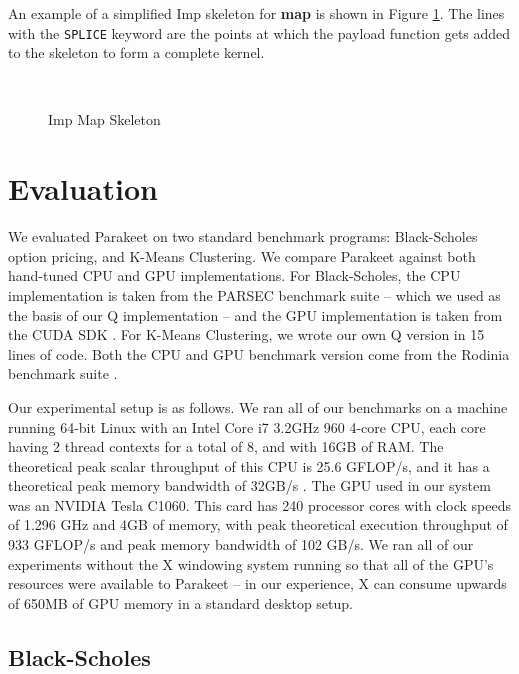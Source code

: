 \documentclass[preprint]{sigplanconf}
\begin{document}
An example of a simplified Imp skeleton for \textbf{map} is shown in Figure \ref{ImpMap}.  The lines with the \texttt{SPLICE} keyword are the points at which the payload function gets added to the skeleton to form a complete kernel.

\begin{figure}[h!]
  \begin{lstlisting}[numbers=none]
    
  \end{lstlisting}
  \caption{Imp Map Skeleton}
  \label{ImpMap}
\end{figure}


\section{Evaluation}
\label{Evaluation}

We evaluated Parakeet on two standard benchmark programs: Black-Scholes option pricing, and K-Means Clustering.  We compare Parakeet against both hand-tuned CPU and GPU implementations.  For Black-Scholes, the CPU implementation is taken from the PARSEC \cite{Bien08} benchmark suite -- which we used as the basis
of our Q implementation -- and the GPU implementation is taken from the CUDA SDK \cite{NvidSD}.  For K-Means Clustering, we wrote our own Q version in 15 lines of code.  Both the CPU and GPU benchmark version come from the Rodinia benchmark suite \cite{Che09}.

Our experimental setup is as follows.  We ran all of our benchmarks on a machine running 64-bit Linux with an Intel Core i7 3.2GHz 960 4-core CPU, each core having 2 thread contexts for a total of 8, and with 16GB of RAM.  The theoretical peak scalar throughput of this CPU is 25.6 GFLOP/s, and it has a theoretical peak memory bandwidth of 32GB/s \cite{Lee10}.  The GPU used in our system was an NVIDIA Tesla C1060. This card has 240 processor cores with clock speeds of 1.296 GHz and 4GB of memory, with peak theoretical execution throughput of 933 GFLOP/s and peak memory bandwidth of 102 GB/s.  We ran all of our experiments without the X windowing system running so that all of the GPU's resources were available to Parakeet -- in our experience, X can consume upwards of 650MB of GPU memory in a standard desktop setup.

\subsection{Black-Scholes}
\label{results-bs}
\end{document}
